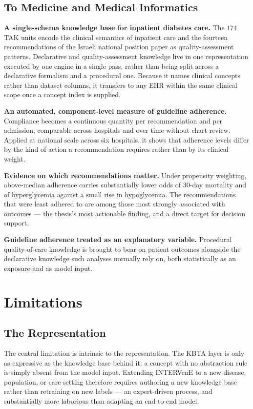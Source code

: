 \subsection{To Medicine and Medical Informatics}

\textbf{A single-schema knowledge base for inpatient diabetes care.} The $174$
TAK units encode the clinical semantics of inpatient care and the fourteen
recommendations of the Israeli national position paper as quality-assessment
patterns. Declarative and quality-assessment knowledge live in one
representation executed by one engine in a single pass, rather than being split
across a declarative formalism and a procedural one. Because it names clinical
concepts rather than dataset columns, it transfers to any EHR within the same
clinical scope once a concept index is supplied.

\textbf{An automated, component-level measure of guideline adherence.}
Compliance becomes a continuous quantity per recommendation and per admission,
comparable across hospitals and over time without chart review. Applied at
national scale across six hospitals, it shows that adherence levels differ by
the kind of action a recommendation requires rather than by its clinical weight.

\textbf{Evidence on which recommendations matter.} Under propensity weighting,
above-median adherence carries substantially lower odds of $30$-day mortality
and of hyperglycemia against a small rise in hypoglycemia. The recommendations
that were least adhered to are among those most strongly associated with
outcomes --- the thesis's most actionable finding, and a direct target for
decision support.

\textbf{Guideline adherence treated as an explanatory variable.} Procedural
quality-of-care knowledge is brought to bear on patient outcomes alongside the
declarative knowledge such analyses normally rely on, both statistically as an
exposure and as model input.

\section{Limitations}
\label{sec:limitations}

\subsection{The Representation}

The central limitation is intrinsic to the representation. The KBTA layer is only as expressive as the knowledge base behind it: a concept with no abstraction rule is simply absent from the model input. Extending INTERVenE to a new disease, population, or care setting therefore requires authoring a new knowledge base rather than retraining on new labels --- an expert-driven process, and substantially more laborious than adapting an end-to-end model.

